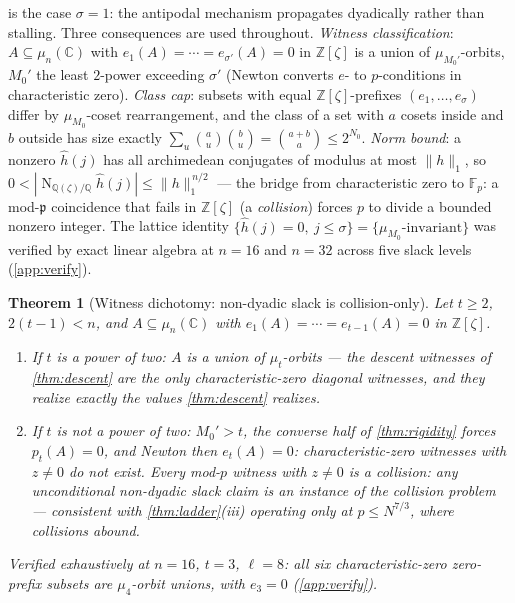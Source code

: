 \documentclass[11pt]{article}
\newtheorem{theorem}{Theorem}[section]
\theoremstyle{definition}
\newcommand{\F}{\mathbb F}
\newcommand{\Z}{\mathbb Z}
\newcommand{\Q}{\mathbb Q}
\newcommand{\mufn}{\mu_n}
\newcommand{\Norm}{\operatorname{N}}
\begin{document}
 is the case $\sigma=1$: the antipodal mechanism propagates dyadically rather than stalling.  Three consequences are used throughout.  \emph{Witness classification}: $A\subseteq\mufn(\mathbb C)$ with $e_1(A)=\cdots=e_{\sigma'}(A)=0$ in $\Z[\zeta]$ is a union of $\mu_{M_0'}$-orbits, $M_0'$ the least $2$-power exceeding $\sigma'$ (Newton converts $e$- to $p$-conditions in characteristic zero).  \emph{Class cap}: subsets with equal $\Z[\zeta]$-prefixes $(e_1,\dots,e_\sigma)$ differ by $\mu_{M_0}$-coset rearrangement, and the class of a set with $a$ cosets inside and $b$ outside has size exactly $\sum_u\binom au\binom bu=\binom{a+b}a\le2^{N_0}$.  \emph{Norm bound}: a nonzero $\widehat h(j)$ has all archimedean conjugates of modulus at most $\|h\|_1$, so $0<|\Norm_{\Q(\zeta)/\Q}\widehat h(j)|\le\|h\|_1^{\,n/2}$ --- the bridge from characteristic zero to $\F_p$: a mod-$\mathfrak p$ coincidence that fails in $\Z[\zeta]$ (a \emph{collision}) forces $p$ to divide a bounded nonzero integer.  The lattice identity $\{\widehat h(j)=0,\ j\le\sigma\}=\{\mu_{M_0}\text{-invariant}\}$ was verified by exact linear algebra at $n=16$ and $n=32$ across five slack levels (\cref{app:verify}).

\begin{theorem}[Witness dichotomy: non-dyadic slack is collision-only]\label{thm:dichotomy}
Let $t\ge2$, $2(t-1)<n$, and $A\subseteq\mufn(\mathbb C)$ with $e_1(A)=\cdots=e_{t-1}(A)=0$ in $\Z[\zeta]$.
\begin{enumerate}[label=(\roman*),leftmargin=2.2em]
\item If $t$ is a power of two: $A$ is a union of $\mu_t$-orbits --- the descent witnesses of \cref{thm:descent} are the \emph{only} characteristic-zero diagonal witnesses, and they realize exactly the values \cref{thm:descent} realizes.
\item If $t$ is not a power of two: $M_0'>t$, the converse half of \cref{thm:rigidity} forces $p_t(A)=0$, and Newton then $e_t(A)=0$: characteristic-zero witnesses with $z\ne0$ \emph{do not exist}.  Every mod-$p$ witness with $z\ne0$ is a collision: any unconditional non-dyadic slack claim is an instance of the collision problem --- consistent with \cref{thm:ladder}(iii) operating only at $p\le N^{7/3}$, where collisions abound.
\end{enumerate}
Verified exhaustively at $n=16$, $t=3$, $\ell=8$: all six characteristic-zero zero-prefix subsets are $\mu_4$-orbit unions, with $e_3=0$ (\cref{app:verify}).
\end{theorem}
\end{document}
